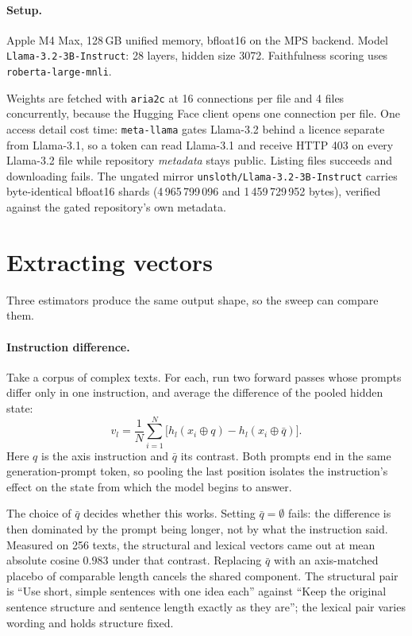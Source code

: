 \documentclass[twocolumn,10pt,a4paper]{article}
\newcommand{\code}[1]{\texttt{\small #1}}
\begin{document}
\paragraph{Setup.} Apple M4 Max, 128\,GB unified memory, bfloat16 on the MPS
backend. Model \code{Llama-3.2-3B-Instruct}: 28 layers, hidden size 3072.
Faithfulness scoring uses \code{roberta-large-mnli}.

Weights are fetched with \code{aria2c} at 16 connections per file and 4 files
concurrently, because the Hugging Face client opens one connection per file.
One access detail cost time: \code{meta-llama} gates Llama-3.2 behind a licence
separate from Llama-3.1, so a token can read Llama-3.1 and receive HTTP 403 on
every Llama-3.2 file while repository \emph{metadata} stays public. Listing files
succeeds and downloading fails. The ungated mirror
\code{unsloth/Llama-3.2-3B-Instruct} carries byte-identical bfloat16 shards
(4\,965\,799\,096 and 1\,459\,729\,952 bytes), verified against the gated
repository's own metadata.

\section{Extracting vectors}

Three estimators produce the same output shape, so the sweep can compare them.

\paragraph{Instruction difference.} Take a corpus of complex texts. For each,
run two forward passes whose prompts differ only in one instruction, and average
the difference of the pooled hidden state:
\begin{equation}
v_l = \frac{1}{N}\sum_{i=1}^{N}
      \bigl[h_l(x_i \oplus q) - h_l(x_i \oplus \bar q)\bigr].
\label{eq:idiff}
\end{equation}
Here $q$ is the axis instruction and $\bar q$ its contrast. Both prompts end in
the same generation-prompt token, so pooling the last position isolates the
instruction's effect on the state from which the model begins to answer.

The choice of $\bar q$ decides whether this works. Setting $\bar q = \emptyset$
fails: the difference is then dominated by the prompt being longer, not by what
the instruction said. Measured on 256 texts, the structural and lexical vectors
came out at mean absolute cosine $0.983$ under that contrast. Replacing
$\bar q$ with an axis-matched placebo of comparable length cancels the shared
component. The structural pair is ``Use short, simple sentences with one idea
each'' against ``Keep the original sentence structure and sentence length exactly
as they are''; the lexical pair varies wording and holds structure fixed.
\end{document}
